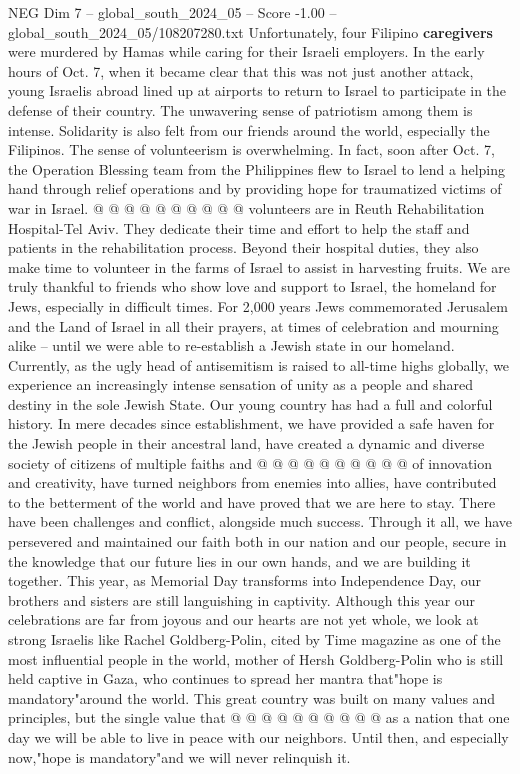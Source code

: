\begin{textsample}{NEG Dim 7 – global\_south\_2024\_05 – Score -1.00 – global\_south\_2024\_05/108207280.txt}
Unfortunately, four Filipino \textbf{caregivers} were murdered by Hamas while caring for their Israeli employers.
In the early hours of Oct. 7, when it became clear that this was not just another attack, young Israelis abroad lined up at airports to return to Israel to participate in the defense of their country.
The unwavering sense of patriotism among them is intense.
Solidarity is also felt from our friends around the world, especially the Filipinos.
The sense of volunteerism is overwhelming.
In fact, soon after Oct. 7, the Operation Blessing team from the Philippines flew to Israel to lend a helping hand through relief operations and by providing hope for traumatized victims of war in Israel. @ @ @ @ @ @ @ @ @ @ volunteers are in Reuth Rehabilitation Hospital-Tel Aviv.
They dedicate their time and effort to help the staff and patients in the rehabilitation process.
Beyond their hospital duties, they also make time to volunteer in the farms of Israel to assist in harvesting fruits.
We are truly thankful to friends who show love and support to Israel, the homeland for Jews, especially in difficult times.
For 2,000 years Jews commemorated Jerusalem and the Land of Israel in all their prayers, at times of celebration and mourning alike -- until we were able to re-establish a Jewish state in our homeland.
Currently, as the ugly head of antisemitism is raised to all-time highs globally, we experience an increasingly intense sensation of unity as a people and shared destiny in the sole Jewish State.
Our young country has had a full and colorful history.
In mere decades since establishment, we have provided a safe haven for the Jewish people in their ancestral land, have created a dynamic and diverse society of citizens of multiple faiths and @ @ @ @ @ @ @ @ @ @ of innovation and creativity, have turned neighbors from enemies into allies, have contributed to the betterment of the world and have proved that we are here to stay.
There have been challenges and conflict, alongside much success.
Through it all, we have persevered and maintained our faith both in our nation and our people, secure in the knowledge that our future lies in our own hands, and we are building it together.
This year, as Memorial Day transforms into Independence Day, our brothers and sisters are still languishing in captivity.
Although this year our celebrations are far from joyous and our hearts are not yet whole, we look at strong Israelis like Rachel Goldberg-Polin, cited by Time magazine as one of the most influential people in the world, mother of Hersh Goldberg-Polin who is still held captive in Gaza, who continues to spread her mantra that"hope is mandatory"around the world.
This great country was built on many values and principles, but the single value that @ @ @ @ @ @ @ @ @ @ as a nation that one day we will be able to live in peace with our neighbors.
Until then, and especially now,"hope is mandatory"and we will never relinquish it.

\end{textsample}
